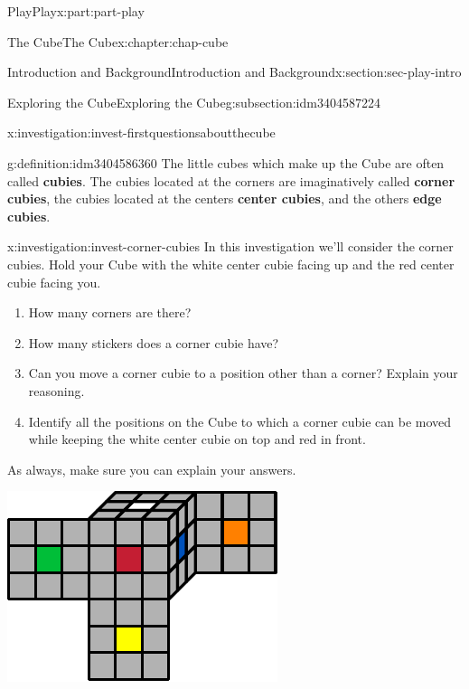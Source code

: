 \documentclass[oneside,10pt,]{book}
\newcommand{\terminology}[1]{\textbf{#1}}
\numberwithin{equation}{section}
\begin{document}
\begin{partptx}{Play}{}{Play}{}{}{x:part:part-play}
\begin{chapterptx}{The Cube}{}{The Cube}{}{}{x:chapter:chap-cube}
\begin{sectionptx}{Introduction and Background}{}{Introduction and Background}{}{}{x:section:sec-play-intro}
\begin{subsectionptx}{Exploring the Cube}{}{Exploring the Cube}{}{}{g:subsection:idm3404587224}
\begin{investigation}{}{x:investigation:invest-firstquestionsaboutthecube}
\end{investigation}%
\begin{definition}{}{g:definition:idm3404586360}%
%
%
%
%
The little cubes which make up the Cube are often called \terminology{cubies}. The cubies located at the corners are imaginatively called \terminology{corner cubies}, the cubies located at the centers \terminology{center cubies}, and the others \terminology{edge cubies}.%
\end{definition}
\begin{investigation}{}{x:investigation:invest-corner-cubies}%
In this investigation we'll consider the corner cubies. Hold your Cube with the white center cubie facing up and the red center cubie facing you.%
\begin{enumerate}
\item{}How many corners are there?%
\item{}How many stickers does a corner cubie have?%
\item{}Can you move a corner cubie to a position other than a corner? Explain your reasoning.%
\item{}Identify all the positions on the Cube to which a corner cubie can be moved while keeping the white center cubie on top and red in front.%
\end{enumerate}
As always, make sure you can explain your answers.%
\begin{image}{0.25}{0.5}{0.25}%
\includegraphics[width=\linewidth]{./images/moving_cubies.pdf}
\end{image}%
\par\smallskip%

\end{investigation}
\end{subsectionptx}
\end{sectionptx}
\end{chapterptx}
\end{partptx}
\end{document}
